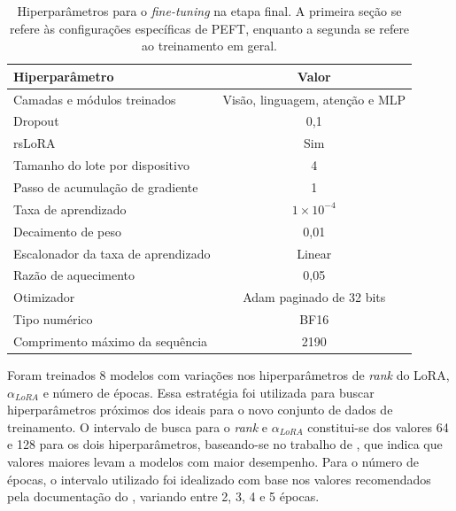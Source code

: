 \begin{table}[ht]
    \caption{\small Hiperparâmetros para o \textit{fine-tuning} na etapa final. A primeira seção se refere às
    configurações específicas de \ac{PEFT}, enquanto a segunda se refere ao treinamento em geral.}
    \centering
    \begin{tabular}{l|c}
        \hline
        Hiperparâmetro                     & Valor                                  \\ \hline
        Camadas e módulos treinados        & Visão, linguagem, atenção e \ac{MLP}   \\
        Dropout                            & 0,1                                    \\
        \ac{rsLoRA}                        & Sim                                    \\ \hline
        Tamanho do lote por dispositivo    & 4                                      \\
        Passo de acumulação de gradiente   & 1                                      \\
        Taxa de aprendizado                & \begin{math}1 \times 10^{-4}\end{math} \\
        Decaimento de peso                 & 0,01                                   \\
        Escalonador da taxa de aprendizado & Linear                                 \\
        Razão de aquecimento               & 0,05                                   \\
        Otimizador                         & \ac{Adam} paginado de 32 bits          \\
        Tipo numérico                      & \ac{BF16}                              \\
        Comprimento máximo da sequência    & 2190                                   \\ \hline
    \end{tabular}
    \label{tab:final_config}
\end{table}

Foram treinados 8 modelos com variações nos hiperparâmetros de \textit{rank} do \ac{LoRA},
\begin{math}\alpha_{LoRA}\end{math} e número de épocas. Essa estratégia foi utilizada para buscar hiperparâmetros
próximos dos ideais para o novo conjunto de dados de treinamento. O intervalo de busca para o \textit{rank} e
\begin{math}\alpha_{LoRA}\end{math} constitui-se dos valores 64 e 128 para os dois hiperparâmetros, baseando-se no
trabalho de \textcite{tribes2023hyperparameter}, que indica que valores maiores levam a modelos com maior desempenho.
Para o número de épocas, o intervalo utilizado foi idealizado com base nos valores recomendados pela documentação do
\textcite{unsloth2025lora}, variando entre 2, 3, 4 e 5 épocas.


